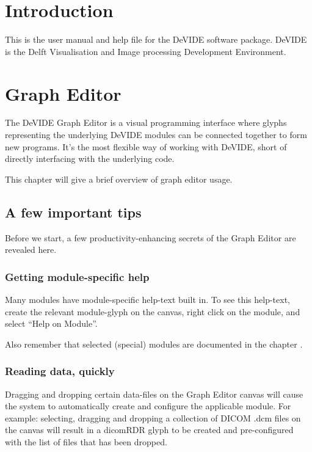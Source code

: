 \chapter{Introduction}%
%
%
\setfooter{\thepage}{}{}{}{}{\thepage}%
This is the user manual and help file for the DeVIDE software package.
DeVIDE is the Delft Visualisation and Image processing Development
Environment.

\chapter{Graph Editor}
%
%
\setfooter{\thepage}{}{}{}{}{\thepage}%

The DeVIDE Graph Editor is a visual programming interface where glyphs
representing the underlying DeVIDE modules can be connected together
to form new programs.  It's the most flexible way of working with
DeVIDE, short of directly interfacing with the underlying code.

This chapter will give a brief overview of graph editor usage.

\section{A few important tips}
Before we start, a few productivity-enhancing secrets of the Graph
Editor are revealed here.

\subsection{Getting module-specific help}
Many modules have module-specific help-text built in.  To see this
help-text, create the relevant module-glyph on the canvas, right click
on the module, and select ``Help on Module''.

Also remember that selected (special) modules are documented in the
chapter .

\subsection{Reading data, quickly}
Dragging and dropping certain data-files on the Graph Editor canvas
will cause the system to automatically create and configure the
applicable module.  For example: selecting, dragging and dropping a
collection of DICOM .dcm files on the canvas will result in a dicomRDR
glyph to be created and pre-configured with the list of files that has
been dropped.

